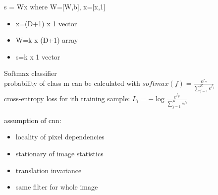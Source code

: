 \documentclass[a4paper, fleqn]{article}
\begin{document}
s = Wx where W=[W,b], x=[x,1]\begin{itemize}
\item x=(D+1) x 1 vector
\item W=k x (D+1) array
\item s=k x 1 vector
\end{itemize}

Softmax classifier\\
probability of class m can be calculated with $softmax(f)=\frac{e^{f_m}}{\sum_{j=1}^Ke^{f_j}}$\\
cross-entropy loss for ith training sample: $L_i=-\log\frac{e^{f_{yi}}}{\sum_{j=1}^Ke^{fi}}$

assumption of cnn:
\begin{itemize}
\item locality of pixel dependencies
\item stationary of image statistics
\item translation invariance
\item same filter for whole image
\end{itemize}
\end{document}
